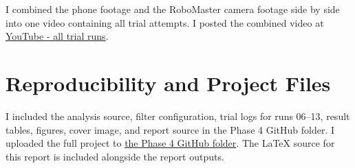 \documentclass[11pt]{article}
\begin{document}
I combined the phone footage and the RoboMaster camera footage side by side into one video containing all trial attempts. I posted the combined video at \href{https://youtube.com/shorts/OIwx5EAHnV4}{YouTube - all trial runs}.

\section{Reproducibility and Project Files}
I included the analysis source, filter configuration, trial logs for runs 06--13, result tables, figures, cover image, and report source in the Phase 4 GitHub folder. I uploaded the full project to \href{https://github.com/ssifat109/robomaster-odometry-phase3/tree/main/phase4}{the Phase 4 GitHub folder}. The LaTeX source for this report is included alongside the report outputs.
\end{document}
